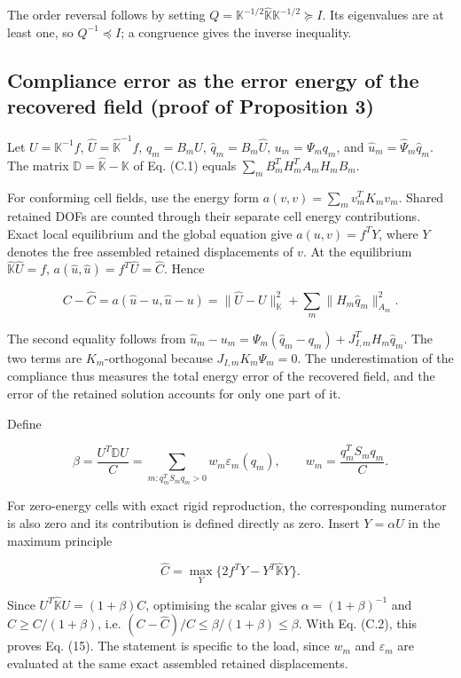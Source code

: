 \documentclass[preprint,12pt,authoryear]{elsarticle}
\begin{document}
The order reversal follows by setting \(Q=\mathbb K^{-1/2}\widehat{\mathbb K}\mathbb K^{-1/2}\succeq I\). Its eigenvalues are at least one, so \(Q^{-1}\preceq I\); a congruence gives the inverse inequality.

\subsection{Compliance error as the error energy of the recovered field (proof of Proposition 3)}

Let \(U=\mathbb K^{-1}f\), \(\widehat U=\widehat{\mathbb K}^{-1}f\), \(q_m=B_mU\), \(\widehat q_m=B_m\widehat U\), \(u_m=\Psi_mq_m\), and \(\widehat u_m=\widehat\Psi_m\widehat q_m\). The matrix \(\mathbb D=\widehat{\mathbb K}-\mathbb K\) of Eq. (C.1) equals \(\sum_m B_m^TH_m^TA_mH_mB_m\).

For conforming cell fields, use the energy form \(a(v,v)=\sum_m v_m^TK_mv_m\). Shared retained DOFs are counted through their separate cell energy contributions. Exact local equilibrium and the global equation give \(a(u,v)=f^TY\), where \(Y\) denotes the free assembled retained displacements of \(v\). At the equilibrium \(\widehat{\mathbb K}\widehat U=f\), \(a(\widehat u,\widehat u)=f^T\widehat U=\widehat C\). Hence

\[
\boxed{C-\widehat C=a(\widehat u-u,\widehat u-u)
=\|\widehat U-U\|_{\mathbb K}^2
+\sum_m\|H_m\widehat q_m\|_{A_m}^2.}
\]

The second equality follows from
\(\widehat u_m-u_m=\Psi_m(\widehat q_m-q_m)+J_{I,m}^TH_m\widehat q_m\).
The two terms are \(K_m\)-orthogonal because \(J_{I,m}K_m\Psi_m=0\). The underestimation of the compliance thus measures the total energy error of the recovered field, and the error of the retained solution accounts for only one part of it.

Define

\[
\beta=\frac{U^T\mathbb D U}{C}
=\sum_{m:q_m^TS_mq_m>0}w_m\varepsilon_m(q_m),
\qquad w_m=\frac{q_m^TS_mq_m}{C}.
\]

For zero-energy cells with exact rigid reproduction, the corresponding numerator is also zero and its contribution is defined directly as zero. Insert \(Y=\alpha U\) in the maximum principle

\[
\widehat C=\max_Y\{2f^TY-Y^T\widehat{\mathbb K}Y\}.
\]

Since \(U^T\widehat{\mathbb K}U=(1+\beta)C\), optimising the scalar gives \(\alpha=(1+\beta)^{-1}\) and \(\widehat C\ge C/(1+\beta)\), i.e. \((C-\widehat C)/C\le\beta/(1+\beta)\le\beta\). With Eq. (C.2), this proves Eq. (15). The statement is specific to the load, since \(w_m\) and \(\varepsilon_m\) are evaluated at the same exact assembled retained displacements.
\end{document}
